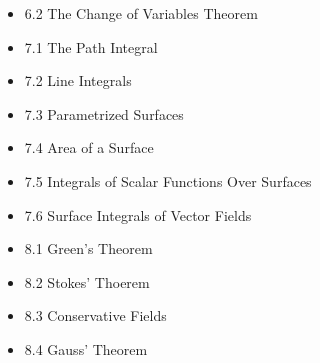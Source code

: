 \documentclass[11pt]{article}
\theoremstyle{plain}
\theoremstyle{definition}
\theoremstyle{remark}
\newcommand{\<}{\langle}
\renewcommand{\>}{\rangle}
\begin{document}
\begin{itemize}
  \item 6.2 The Change of Variables Theorem
  \item 7.1 The Path Integral
  \item 7.2 Line Integrals
  \item 7.3 Parametrized Surfaces
  \item 7.4 Area of a Surface
  \item 7.5 Integrals of Scalar Functions Over Surfaces
  \item 7.6 Surface Integrals of Vector Fields
  \item 8.1 Green's Theorem
  \item 8.2 Stokes' Thoerem
  \item 8.3 Conservative Fields
  \item 8.4 Gauss' Theorem
\end{itemize}
\end{document}
